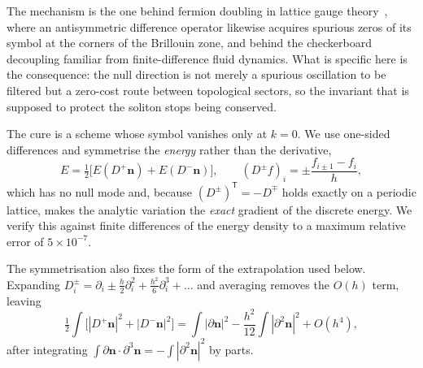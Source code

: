 \documentclass[aps,prd,preprint,nofootinbib,longbibliography]{revtex4-2}
\newcommand{\nv}{\bm{n}}
\begin{document}
The mechanism is the one behind fermion doubling in lattice gauge
theory~\cite{nielsen1981}, where an antisymmetric difference operator likewise
acquires spurious zeros of its symbol at the corners of the Brillouin zone, and
behind the checkerboard decoupling familiar from finite-difference fluid
dynamics. What is specific here is the consequence: the null direction is not
merely a spurious oscillation to be filtered but a zero-cost route between
topological sectors, so the invariant that is supposed to protect the soliton
stops being conserved.

The cure is a scheme whose symbol vanishes only at $k=0$. We use one-sided
differences and symmetrise the \emph{energy} rather than the derivative,
\begin{equation}
E=\tfrac12\big[E(D^+\nv)+E(D^-\nv)\big],\qquad
(D^\pm f)_i=\pm\frac{f_{i\pm1}-f_i}{h},
\label{eq:sym}
\end{equation}
which has no null mode and, because $(D^\pm)^{\mathsf T}=-D^\mp$ holds exactly on
a periodic lattice, makes the analytic variation the \emph{exact} gradient of the
discrete energy. We verify this against finite differences of the energy density
to a maximum relative error of $5\times10^{-7}$.

The symmetrisation also fixes the form of the extrapolation used below. Expanding
$D^\pm_i=\partial_i\pm\tfrac{h}{2}\partial_i^2+\tfrac{h^2}{6}\partial_i^3+\ldots$
and averaging removes the $O(h)$ term, leaving
\begin{equation}
\tfrac12\!\int\!\big[|D^+\nv|^2+|D^-\nv|^2\big]
 = \int\!|\partial\nv|^2 - \frac{h^2}{12}\int\!|\partial^2\nv|^2 + O(h^4),
\label{eq:h2}
\end{equation}
after integrating $\int\partial\nv\cdot\partial^3\nv=-\int|\partial^2\nv|^2$ by
parts.
\end{document}

